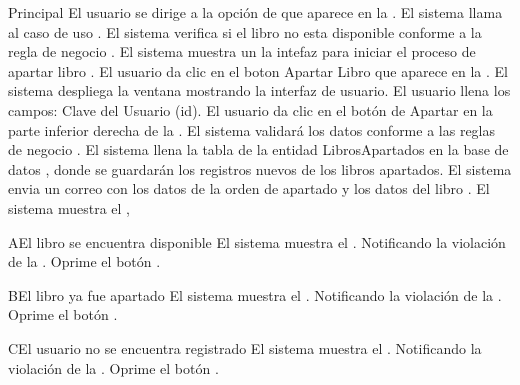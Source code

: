 	\begin{UCtrayectoria}{Principal}
		\UCpaso[\UCactor] El usuario se dirige a la opción de  que aparece en la .
		\UCpaso[\UCsist] El sistema llama al caso de uso .
		\UCpaso[\UCsist] El sistema verifica si el libro no esta disponible conforme a la regla de negocio .
		\UCpaso[\UCsist] El sistema muestra un la intefaz para iniciar el proceso de apartar libro .
		\UCpaso[\UCactor] El usuario da clic en el boton Apartar Libro que aparece en la .
		\UCpaso[\UCsist] El sistema despliega la ventana  mostrando la interfaz de usuario.
		\UCpaso[\UCactor] El usuario llena los campos: Clave del Usuario (id).
		\UCpaso[\UCactor] El usuario da clic en el botón de Apartar en la parte inferior derecha de la .
		\UCpaso[\UCsist] El sistema validará los datos conforme a las reglas de negocio  .
		\UCpaso[\UCsist] El sistema llena la tabla de la entidad LibrosApartados en la base de datos , donde se guardarán los registros nuevos de los libros apartados. 
		\UCpaso[\UCsist] El sistema envia un correo con los datos de la orden de apartado y los datos del libro .		
		\UCpaso[\UCsist] El sistema muestra el ,
	\end{UCtrayectoria}
		\begin{UCtrayectoriaA}{A}{El libro se encuentra disponible}
			\UCpaso[\UCsist] El sistema muestra el . Notificando la violación de la .
			\UCpaso[\UCactor] Oprime el botón .
		\end{UCtrayectoriaA}		
		\begin{UCtrayectoriaA}{B}{El libro ya fue apartado}
			\UCpaso[\UCsist] El sistema muestra el . Notificando la violación de la .
			\UCpaso[\UCactor] Oprime el botón .
		\end{UCtrayectoriaA}
		
		\begin{UCtrayectoriaA}{C}{El usuario no se encuentra registrado}
			\UCpaso[\UCsist] El sistema muestra el . Notificando la violación de la .
			\UCpaso[\UCactor] Oprime el botón .
		\end{UCtrayectoriaA}
		
